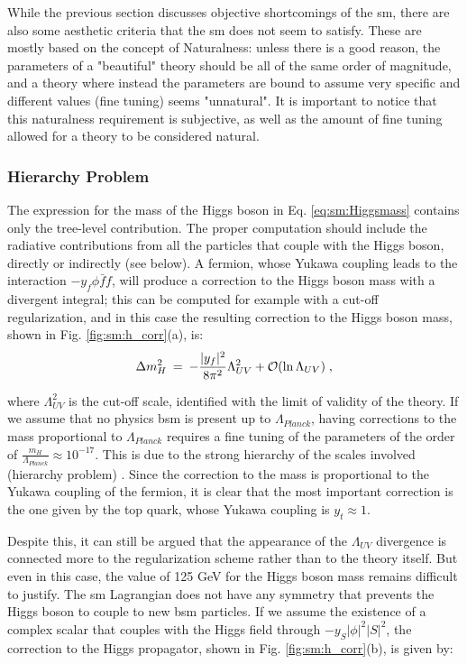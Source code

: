 While the previous section discusses objective shortcomings of the \gls{sm}, there are also some aesthetic criteria that the \gls{sm} does not seem to satisfy. These are mostly based on the concept of Naturalness: unless there is a good reason, the parameters of a "beautiful" theory should be all of the same order of magnitude, and a theory where instead the parameters are bound to assume very specific and different values (fine tuning) seems "unnatural". It is important to notice that this naturalness requirement is subjective, as well as the amount of fine tuning allowed for a theory to be considered natural.


\subsubsection*{Hierarchy Problem}

The expression for the mass of the Higgs boson in Eq. \ref{eq:sm:Higgsmass} contains only the tree-level contribution. The proper computation should include the radiative contributions from all the particles that couple with the Higgs boson, directly or indirectly (see below). A fermion, whose Yukawa coupling leads to the interaction $-y_f \phi \bar{f} f$, will produce a correction to the Higgs boson mass with a divergent integral; this can be computed for example with a cut-off regularization, and in this case the resulting correction to the Higgs boson mass, shown in Fig. \ref{fig:sm:h_corr}(a), is:
\begin{equation}
\Delta m_H^2 \>=\>  
-{|y_f|^2\over 8 \pi^2} \Lambda_{UV}^2 + \mathcal{O}(\ln \Lambda_{UV} ) \; ,
\label{eq:divhf}
\end{equation}

\noindent where $\Lambda_{UV}^2$ is the cut-off scale, identified with the limit of validity of the theory. If we assume that no physics \gls{bsm} is present up to $\Lambda_{Planck}$, having corrections to the mass proportional to $\Lambda_{Planck}$ requires a fine tuning of the parameters of the order of $\frac{m_H}{\Lambda_{Planck}} \approx 10^{-17}$. This is due to the strong hierarchy of the scales involved (hierarchy problem) \cite{Weinberg:1975gm, PhysRevD.20.2619, PhysRevD.14.1667, tHooft:1979rat}. Since the correction to the mass is proportional to the Yukawa coupling of the fermion, it is clear that the most important correction is the one given by the top quark, whose Yukawa coupling is $y_t \approx 1$. %

Despite this, it can still be argued that the appearance of the $\Lambda_{UV}$ divergence is connected more to the regularization scheme rather than to the theory itself. But even in this case, the value of 125 GeV for the Higgs boson mass remains difficult to justify. The \gls{sm} Lagrangian does not have any symmetry that prevents the Higgs boson to couple to new \gls{bsm} particles. If we assume the existence of a complex scalar that couples with the Higgs field through $ -y_S|\phi|^2 |S|^2$, the correction to the Higgs propagator, shown in Fig. \ref{fig:sm:h_corr}(b), is given by:

